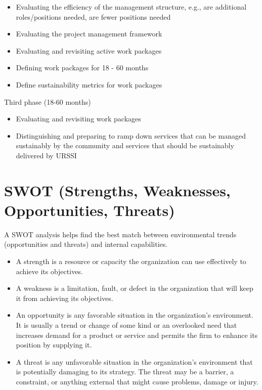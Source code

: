 \documentclass[
]{book}
\providecommand{\tightlist}{%
  \setlength{\itemsep}{0pt}\setlength{\parskip}{0pt}}
\begin{document}
\begin{itemize}
\item
  Evaluating the efficiency of the management structure, e.g., are additional roles/positions needed, are fewer positions needed
\item
  Evaluating the project management framework
\item
  Evaluating and revisiting active work packages
\item
  Defining work packages for 18 - 60 months
\item
  Define sustainability metrics for work packages
\end{itemize}

Third phase (18-60 months)

\begin{itemize}
\item
  Evaluating and revisiting work packages
\item
  Distinguishing and preparing to ramp down services that can be managed sustainably by the community and services that should be sustainably delivered by URSSI
\end{itemize}

\hypertarget{swot-strengths-weaknesses-opportunities-threats}{%
\section{SWOT (Strengths, Weaknesses, Opportunities, Threats)}\label{swot-strengths-weaknesses-opportunities-threats}}

A SWOT analysis helps find the best match between environmental trends (opportunities and threats) and internal capabilities.

\begin{itemize}
\tightlist
\item
  A strength is a resource or capacity the organization can use effectively to achieve its objectives.
\item
  A weakness is a limitation, fault, or defect in the organization that will keep it from achieving its objectives.
\item
  An opportunity is any favorable situation in the organization's environment. It is usually a trend or change of some kind or an overlooked need that increases demand for a product or service and permits the firm to enhance its position by supplying it.
\item
  A threat is any unfavorable situation in the organization's environment that is potentially damaging to its strategy. The threat may be a barrier, a constraint, or anything external that might cause problems, damage or injury.
\end{itemize}
\end{document}
